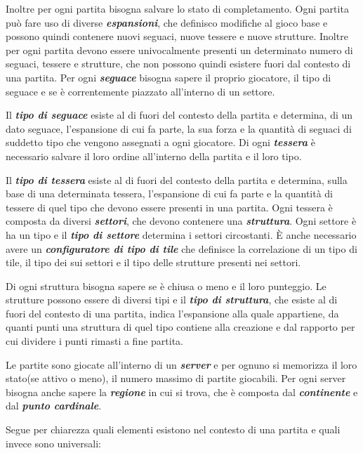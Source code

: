 Inoltre per ogni partita bisogna salvare lo stato di completamento. Ogni partita può fare uso di diverse \textbf{\emph{espansioni}}, che definisco modifiche al gioco base e possono quindi contenere nuovi seguaci, nuove tessere e nuove strutture. Inoltre per ogni partita devono essere univocalmente presenti un determinato numero di seguaci, tessere e strutture, che non possono quindi esistere fuori dal contesto di una partita. Per ogni \textbf{\emph{seguace}} bisogna sapere il proprio giocatore, il tipo di seguace e se è correntemente piazzato all'interno di un settore.
\medskip

Il \textbf{\emph{tipo di seguace}} esiste al di fuori del contesto della partita e determina, di un dato seguace, l'espansione di cui fa parte, la sua forza e la quantità di seguaci di suddetto tipo che vengono assegnati a ogni giocatore. Di ogni \textbf{\emph{tessera}} è necessario salvare il loro ordine all'interno della partita e il loro tipo.
\medskip

Il \textbf{\emph{tipo di tessera}} esiste al di fuori del contesto della partita e determina, sulla base di una determinata tessera, l'espansione di cui fa parte e la quantità di tessere di quel tipo che devono essere presenti in una partita. Ogni tessera è composta da diversi \textbf{\emph{settori}}, che devono contenere una \textbf{\emph{struttura}}. Ogni settore è ha un tipo e il \textbf{\emph{tipo di settore}} determina i settori circostanti. È anche necessario avere un \textbf{\emph{configuratore di tipo di tile}} che definisce la correlazione di un tipo di tile, il tipo dei sui settori e il tipo delle strutture presenti nei settori.
\medskip

Di ogni struttura bisogna sapere se è chiusa o meno e il loro punteggio. Le strutture possono essere di diversi tipi e il \textbf{\emph{tipo di struttura}}, che esiste al di fuori del contesto di una partita, indica l'espansione alla quale appartiene, da quanti punti una struttura di quel tipo contiene alla creazione e dal rapporto per cui dividere i punti rimasti a fine partita.
\medskip

Le partite sono giocate all'interno di un \textbf{\emph{server}} e per ognuno si memorizza il loro stato(se attivo o meno), il numero massimo di partite giocabili. Per ogni server bisogna anche sapere la \textbf{\emph{regione}} in cui si trova, che è composta dal \textbf{\emph{continente}} e dal \textbf{\emph{punto cardinale}}.
\medskip

Segue per chiarezza quali elementi esistono nel contesto di una partita e quali invece sono universali:

